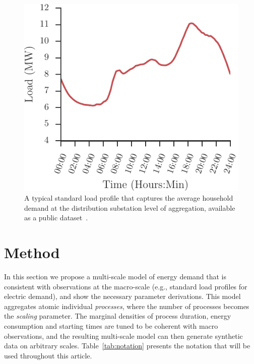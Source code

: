 \documentclass[conference]{IEEEtran}
\begin{document}
\begin{figure}[b]
\centering
\includegraphics{figures/slp.pdf}
\caption{A typical standard load profile that captures the average household demand at the distribution substation level of aggregation, available as a public dataset~\cite{SLPsource}.}
\label{fig:slp}
\end{figure}



\section{Method}
\label{sec:Method}

In this section we propose a multi-scale model of energy demand that is consistent with observations at the macro-scale (e.g., standard load profiles for electric demand), and show the necessary parameter derivations. This model aggregates atomic individual \emph{processes}, where the number of processes becomes the \emph{scaling} parameter. The marginal densities of process duration, energy consumption and starting times are tuned to be coherent with macro observations, and the resulting multi-scale model can then generate synthetic data on arbitrary scales.
Table~\ref{tab:notation} presents the notation that will be used throughout this article.
\end{document}
